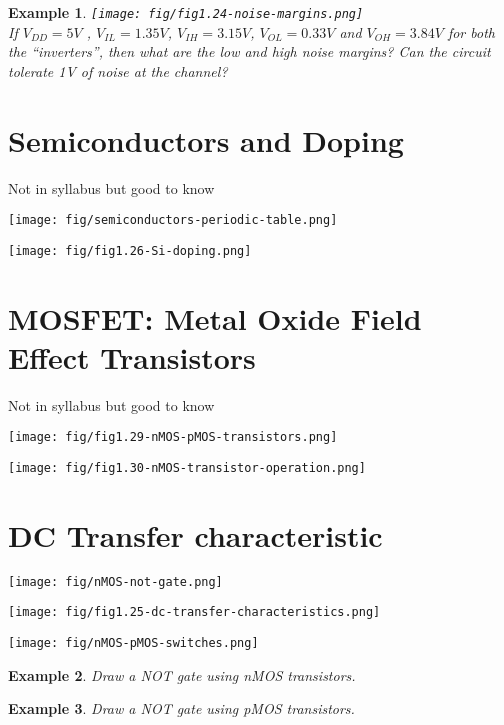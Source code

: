 \documentclass{article}
\newtheorem{example}{Example}
\begin{document}
\begin{example}
  \texttt{[image: fig/fig1.24-noise-margins.png]}\\
  If $V_{DD} = 5V$ , $V_{IL} = 1.35V$, $V_{IH} = 3.15V$, $V_{OL} = 0.33V$ and
  $V_{OH} = 3.84V$ for both the ``inverters'', then what are the low and high
  noise margins? Can the circuit tolerate 1V of noise at the channel?
\end{example}
\vspace{10em}

\section{Semiconductors and Doping}
{\tiny{Not in syllabus but good to know}}

\texttt{[image: fig/semiconductors-periodic-table.png]}


\texttt{[image: fig/fig1.26-Si-doping.png]}

\section{MOSFET: Metal Oxide Field Effect Transistors }
{\tiny{Not in syllabus but good to know}}

\texttt{[image: fig/fig1.29-nMOS-pMOS-transistors.png]}

\texttt{[image: fig/fig1.30-nMOS-transistor-operation.png]}

\section{DC Transfer characteristic}

\texttt{[image: fig/nMOS-not-gate.png]}

\texttt{[image: fig/fig1.25-dc-transfer-characteristics.png]}

\texttt{[image: fig/nMOS-pMOS-switches.png]}


\begin{example}
  Draw a NOT gate using nMOS transistors.
\end{example}
\vspace{10em}

\begin{example}
  Draw a NOT gate using pMOS transistors.
\end{example}
\vspace{10em}
\end{document}
